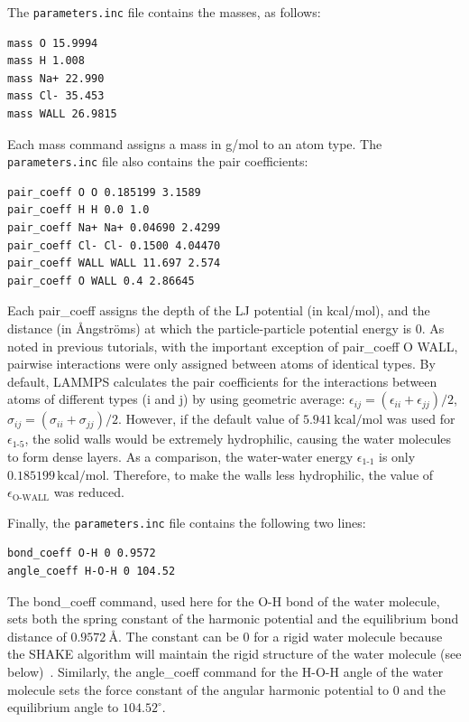 \documentclass[9pt,tutorial]{livecoms}
\newcommand{\lmpcmd}[1]{\hspace{0pt}\colorbox{listing}{\textcolor{command}{\small{#1}}}\hspace{0pt}} %
\newcommand{\flecmd}[1]{\textcolor{command}{\texttt{#1}}} %
\begin{document}
The \flecmd{parameters.inc} file contains the masses, as follows:
\begin{lstlisting}
mass O 15.9994
mass H 1.008
mass Na+ 22.990
mass Cl- 35.453
mass WALL 26.9815
\end{lstlisting}
Each \lmpcmd{mass} command assigns a mass in g/mol to an atom type.
The \flecmd{parameters.inc} file also contains the pair coefficients:
\begin{lstlisting}
pair_coeff O O 0.185199 3.1589
pair_coeff H H 0.0 1.0
pair_coeff Na+ Na+ 0.04690 2.4299
pair_coeff Cl- Cl- 0.1500 4.04470
pair_coeff WALL WALL 11.697 2.574
pair_coeff O WALL 0.4 2.86645
\end{lstlisting}
Each \lmpcmd{pair\_coeff} assigns the depth of the LJ potential (in
kcal/mol), and the distance (in Ångströms) at which the
particle-particle potential energy is 0.  As noted in previous
tutorials, with the important exception of \lmpcmd{pair\_coeff O WALL},
pairwise interactions were only assigned between atoms of identical
types.  By default, LAMMPS calculates the pair coefficients for the
interactions between atoms of different types (i and j) by using
geometric average: $\epsilon_{ij} = (\epsilon_{ii} + \epsilon_{jj})/2$,
$\sigma_{ij} = (\sigma_{ii} + \sigma_{jj})/2$.  However, if the default
value of $5.941\,\text{kcal/mol}$ was used for $\epsilon_\text{1-5}$,
the solid walls would be extremely hydrophilic, causing the water
molecules to form dense layers.  As a comparison, the water-water energy
$\epsilon_\text{1-1}$ is only $0.185199\,\text{kcal/mol}$.  Therefore,
to make the walls less hydrophilic, the value of
$\epsilon_\text{O-WALL}$ was reduced.

Finally, the \flecmd{parameters.inc} file contains the following two lines:
\begin{lstlisting}
bond_coeff O-H 0 0.9572
angle_coeff H-O-H 0 104.52
\end{lstlisting}
The \lmpcmd{bond\_coeff} command, used here for the O-H bond of the water
molecule, sets both the spring constant of the harmonic potential and the
equilibrium bond distance of $0.9572~\text{\AA{}}$.  The constant can be 0 for a
rigid water molecule because the SHAKE algorithm will maintain the rigid
structure of the water molecule (see below)~\cite{ryckaert1977numerical, andersen1983rattle}.
Similarly, the \lmpcmd{angle\_coeff} command for the H-O-H angle of the water molecule sets
the force constant of the angular harmonic potential to 0 and the equilibrium
angle to $104.52^\circ$.
\end{document}
